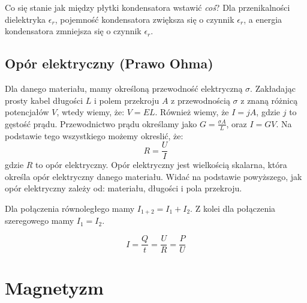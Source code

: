 \documentclass{../notatki}
\begin{document}
Co się stanie jak między płytki kondensatora wstawić \textit{coś}?
Dla przenikalności dielektryka $\epsilon_r$, pojemność kondensatora zwiększa się
o czynnik $\epsilon_r$, a energia kondensatora zmniejsza się o
czynnik $\epsilon_r$.

\subsection{Opór elektryczny (Prawo Ohma)}

Dla danego materiału, mamy określoną przewodność elektryczną $\sigma$.
Zakładając prosty kabel długości $L$ i polem przekroju $A$ z przewodnością
$\sigma$ z znaną różnicą potencjałów $V$, wtedy wiemy, że: $V = EL$. Również
wiemy, że $I = jA$, gdzie $j$ to gęstość prądu. Przewodnictwo prądu określamy
jako $G = \frac{\sigma A}{L}$, oraz $I = GV$. Na podstawie tego wszystkiego
możemy okreslić, że:
$$
R = \frac{U}{I}
$$
gdzie $R$ to opór elektryczny. Opór
elektryczny jest wielkością skalarna, która określa opór elektryczny danego
materiału. Widać na podstawie powyższego, jak opór elektryczny zależy od:
materiału, długości i pola przekroju.

\begin{figure*}[h]
  \centering
\end{figure*}
Dla połączenia równoległego mamy $I_{1+2} = I_1 + I_2$. Z kolei dla
połączenia szeregowego mamy $I_1 = I_2$.

$$
I = \frac{Q}{t} = \frac{U}{R} = \frac{P}{U}
$$

\section{Magnetyzm}
\end{document}
